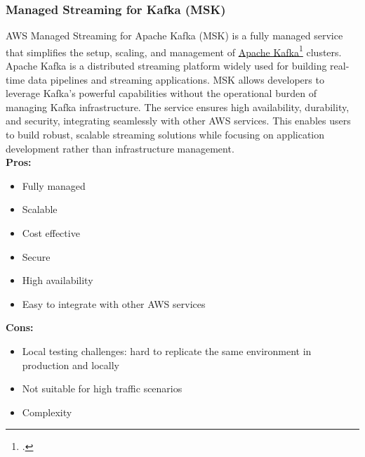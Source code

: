         \subsubsection{Managed Streaming for Kafka (MSK)}
        \label{aws:msk}
        AWS Managed Streaming for Apache Kafka (MSK) is a fully managed service that simplifies the setup, scaling, and management of \href{https://kafka.apache.org/}{Apache Kafka}\footcite{site:apache-kafka} clusters. Apache Kafka is a distributed streaming platform widely used for building real-time data pipelines and streaming applications. MSK allows developers to leverage Kafka's powerful capabilities without the operational burden of managing Kafka infrastructure. The service ensures high availability, durability, and security, integrating seamlessly with other AWS services. This enables users to build robust, scalable streaming solutions while focusing on application development rather than infrastructure management.\\
        \textbf{Pros:}
        \begin{itemize}
            \item Fully managed
            \item Scalable
            \item Cost effective
            \item Secure
            \item High availability
            \item Easy to integrate with other AWS services
        \end{itemize}
        \textbf{Cons:}
        \begin{itemize}
            \item Local testing challenges: hard to replicate the same environment in production and locally
            \item Not suitable for high traffic scenarios
            \item Complexity
        \end{itemize}

